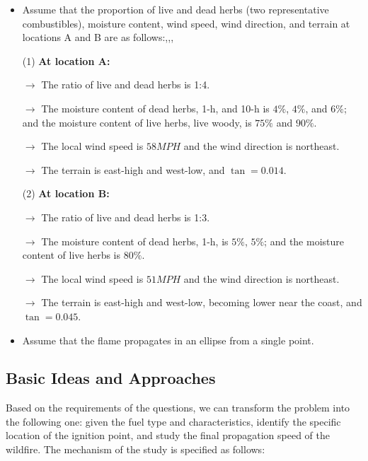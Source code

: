 \documentclass[12pt]{article}  %
\begin{document}
\begin{itemize}
	\setlength{\parsep}{0ex} 
	\setlength{\topsep}{2ex} 
	\setlength{\itemsep}{1ex} 
	\item Assume that the proportion of live and dead herbs (two representative combustibles), moisture content, wind speed, wind direction, and terrain at locations A and B are as follows:\cite{1},\cite{2},\cite{3},\cite{4}
	
	(1) \textbf{At location A:}
	\vspace{2pt}
	
	$\rightarrow$ The ratio of live and dead herbs is 1:4.
	\vspace{2pt}
	
	$\rightarrow$ The moisture content of dead herbs, 1-h, and 10-h is $4\%$, $4\%$, and $6\%$; and the moisture content of live herbs, live woody, is $75\%$ and $90\%$. 
	\vspace{2pt}
	
	$\rightarrow$ The local wind speed is $58 MPH$ and the wind direction is northeast.
	\vspace{2pt} 
	
	$\rightarrow$ The terrain is east-high and west-low, and $\tan = 0.014$.
	
	(2) \textbf{At location B:} 
	\vspace{2pt}
	
	$\rightarrow$ The ratio of live and dead herbs is 1:3.
	\vspace{2pt}
	
	$\rightarrow$ The moisture content of dead herbs, 1-h, is $5\%$, $5\%$; and the moisture content of live herbs is $80\%$.
	\vspace{2pt}
	
	$\rightarrow$ The local wind speed is $51 MPH$ and the wind direction is northeast.
	\vspace{2pt} 
	
	$\rightarrow$ The terrain is east-high and west-low, becoming lower near the coast, and $\tan = 0.045$.

	\item Assume that the flame propagates in an ellipse from a single point.
\end{itemize}

\subsection{Basic Ideas and Approaches}
Based on the requirements of the questions, we can transform the problem into the following one: given the fuel type and characteristics, identify the specific location of the ignition point, and study the final propagation speed of the wildfire. The mechanism of the study is specified as follows:
\end{document}
